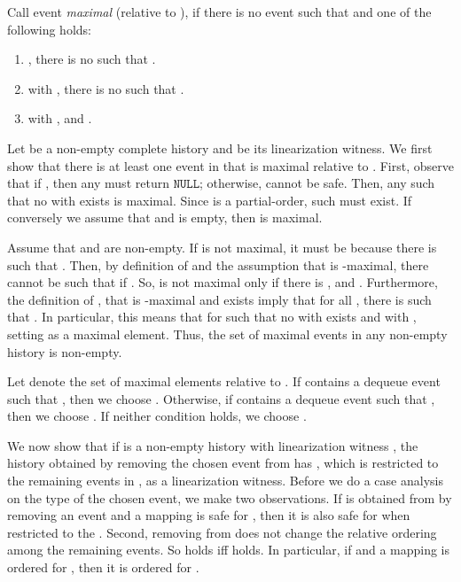 \documentclass{LMCS}
\newcommand{\NULL}{\ensuremath{\mathtt{NULL}}}
\begin{document}
Call event  {\em maximal} (relative to ), if there is no event  such that  and one of the following holds:
\begin{enumerate}
\item , there is no  such that .
\item  with , there is no  such that .
\item  with , and .
\end{enumerate}
Let  be a non-empty complete history and  be its linearization witness.
We first show that there is at least one event in  that is maximal relative to .
First, observe that if , then any  must return {\NULL}; otherwise,  cannot be safe.
Then, any  such that no  with  exists is maximal.
Since  is a partial-order, such  must exist.
If conversely we assume that  and  is empty, then  is maximal.

Assume that  and  are non-empty.
If  is not maximal, it must be because there is  such that .
Then, by definition of  and the assumption that  is -maximal, there cannot be  such that  if .
So,  is not maximal only if there is ,  and .
Furthermore, the definition of , that  is -maximal and  exists imply that for all , there is   such that .
In particular, this means that for  such that no  with  exists and  with , setting  as a maximal element.
Thus, the set of maximal events in any non-empty history is non-empty. 

Let  denote the set of maximal elements relative to .
If  contains a dequeue event  such that , then we choose .
Otherwise, if  contains a dequeue event  such that , then we choose .
If neither condition holds, we choose .

We now show that if  is a non-empty history with linearization witness , the history  obtained by removing the chosen event from  has , which is  restricted to the remaining events in , as a linearization witness.
Before we do a case analysis on the type of the chosen event, we make two observations. 
If  is obtained from  by removing an event  and a mapping is safe for , then it is also safe for  when restricted to the .
Second, removing  from  does not change the relative ordering among the remaining events.
So  holds iff  holds.
In particular, if  and a mapping is ordered for , then it is ordered for .
\end{document}
